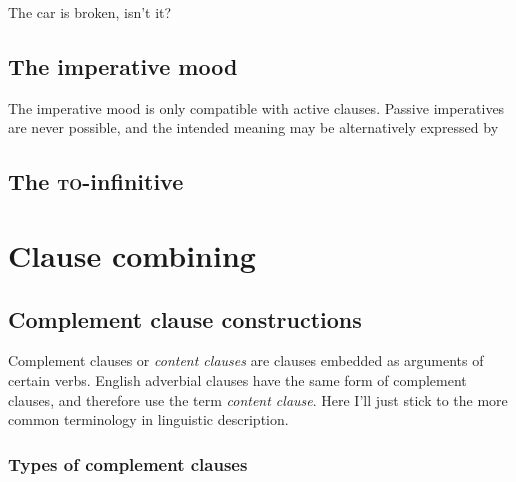 \documentclass[UTF8, a4paper, oneside, scheme=plain, 12pt]{ctexbook}
\newcommand*{\term}[1]{\emph{#1}}
\newcommand{\formcat}[1]{\textsc{#1}}
\begin{document}
\begin{exe}
    \ex The car is broken, isn't it?
\end{exe}

\section{The imperative mood}

The imperative mood is only compatible with active clauses.
Passive imperatives are never possible, 
and the intended meaning may be alternatively expressed by 

\section{The \formcat{to}-infinitive}

\chapter{Clause combining}\label{chap:clause-combining}

\section{Complement clause constructions}\label{sec:clause-combining.complement-clause}

Complement clauses or \term{content clauses} \citep{cgel} are clauses embedded as arguments of certain verbs.
English adverbial clauses have the same form of complement clauses,
and therefore \citet{cgel} use the term \term{content clause}.
Here I'll just stick to the more common terminology in linguistic description.

\subsection{Types of complement clauses}
\end{document}
